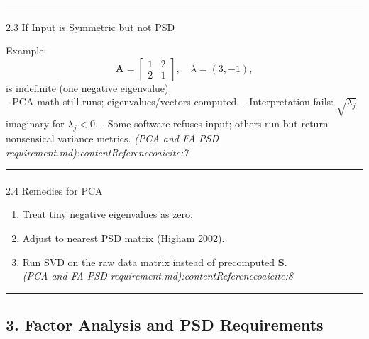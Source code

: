 \documentclass[
  letterpaper,
  DIV=11,
  numbers=noendperiod]{scrartcl}
\makeatletter
\let\oldparagraph\paragraph
\renewcommand{\paragraph}{
    \@ifstar
      \xxxParagraphStar
      \xxxParagraphNoStar
  }
\newcommand{\xxxParagraphStar}[1]{\oldparagraph*{#1}\mbox{}}
\newcommand{\xxxParagraphNoStar}[1]{\oldparagraph{#1}\mbox{}}
\providecommand{\tightlist}{%
  \setlength{\itemsep}{0pt}\setlength{\parskip}{0pt}}
\theoremstyle{remark}
\makeatother
\begin{document}
\begin{center}\rule{0.5\linewidth}{0.5pt}\end{center}

\paragraph{2.3 If Input is Symmetric but not
PSD}\label{if-input-is-symmetric-but-not-psd}

Example:\\
\[
\mathbf{A} = \begin{bmatrix} 1 & 2 \\ 2 & 1 \end{bmatrix},\quad \lambda = (3,-1),
\] is indefinite (one negative eigenvalue).\\
- PCA math still runs; eigenvalues/vectors computed. - Interpretation
fails: \(\sqrt{\lambda_j}\) imaginary for \(\lambda_j<0\). - Some
software refuses input; others run but return nonsensical variance
metrics. \emph{(PCA and FA PSD
requirement.md):contentReference{oaicite:7}}

\begin{center}\rule{0.5\linewidth}{0.5pt}\end{center}

\paragraph{2.4 Remedies for PCA}\label{remedies-for-pca}

\begin{enumerate}
\def\labelenumi{\arabic{enumi}.}
\tightlist
\item
  Treat tiny negative eigenvalues as zero.\\
\item
  Adjust to nearest PSD matrix (Higham 2002).\\
\item
  Run SVD on the raw data matrix instead of precomputed
  \(\mathbf{S}\).\\
  \emph{(PCA and FA PSD requirement.md):contentReference{oaicite:8}}
\end{enumerate}

\begin{center}\rule{0.5\linewidth}{0.5pt}\end{center}

\subsection{3. Factor Analysis and PSD
Requirements}\label{factor-analysis-and-psd-requirements}
\end{document}
